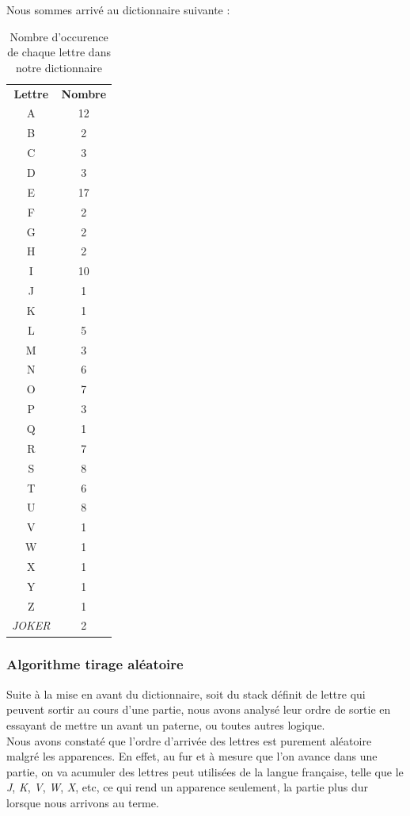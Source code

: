 \documentclass[a4paper,12pt]{article}
\begin{document}
		Nous sommes arrivé au dictionnaire suivante : 
		
		\begin{table}[h]
			\centering
			\begin{tabular}{cc}
				\textbf{Lettre} & \textbf{Nombre} \\
				A     & 12 \\
				B     & 2 \\
				C     & 3 \\
				D     & 3 \\
				E     & 17 \\
				F     & 2 \\
				G     & 2 \\
				H     & 2 \\
				I     & 10 \\
				J     & 1 \\
				K     & 1 \\
				L     & 5 \\
				M     & 3 \\
				N     & 6 \\
				O     & 7 \\
				P     & 3 \\
				Q     & 1 \\
				R     & 7 \\
				S     & 8 \\
				T     & 6 \\
				U     & 8 \\
				V     & 1 \\
				W     & 1 \\
				X     & 1 \\
				Y     & 1 \\
				Z     & 1 \\
				\textit{JOKER} & 2 
			\end{tabular}
			\caption{Nombre d'occurence de chaque lettre dans notre dictionnaire}
		\end{table}
		
		\subsubsection{Algorithme tirage aléatoire}
		Suite à la mise en avant du dictionnaire, soit du stack définit de lettre qui peuvent sortir au cours d'une partie, nous avons analysé leur ordre de sortie en essayant de mettre un avant un paterne, ou toutes autres logique. \\
		Nous avons constaté que l'ordre d'arrivée des lettres est purement aléatoire malgré les apparences. En effet, au fur et à mesure que l'on avance dans une partie, on va acumuler des lettres peut utilisées de la langue française, telle que le \textit{J}, \textit{K}, \textit{V}, \textit{W}, \textit{X}, etc, ce qui rend un apparence seulement, la partie plus dur lorsque nous arrivons au terme.
		
\end{document}
